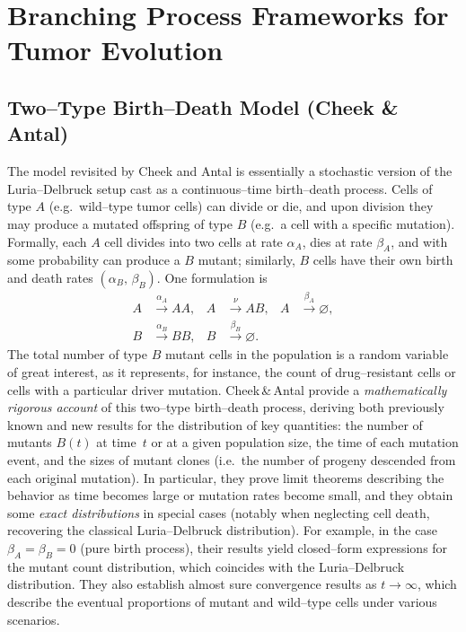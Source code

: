 \documentclass[11pt]{article}
\begin{document}
\section{Branching Process Frameworks for Tumor Evolution}
\subsection{Two--Type Birth--Death Model (Cheek \& Antal)}
The model revisited by Cheek and Antal is essentially a stochastic version of the Luria--Delbruck setup cast as a continuous--time birth--death process. Cells of type $A$ (e.g.~wild--type tumor cells) can divide or die, and upon division they may produce a mutated offspring of type $B$ (e.g.~a cell with a specific mutation). Formally, each $A$ cell divides into two cells at rate $\alpha_A$, dies at rate $\beta_A$, and with some probability can produce a $B$ mutant; similarly, $B$ cells have their own birth and death rates $(\alpha_B,\,\beta_B)$. One formulation is
\begin{align*}
A &\xrightarrow{\alpha_A} AA, & A &\xrightarrow{\nu} AB, & A &\xrightarrow{\beta_A} \varnothing,\\
B &\xrightarrow{\alpha_B} BB, & B &\xrightarrow{\beta_B} \varnothing. & &
\end{align*}
The total number of type $B$ mutant cells in the population is a random variable of great interest, as it represents, for instance, the count of drug--resistant cells or cells with a particular driver mutation. Cheek\,\&\,Antal provide a \emph{mathematically rigorous account} of this two--type birth--death process, deriving both previously known and new results for the distribution of key quantities: the number of mutants $B(t)$ at time~$t$ or at a given population size, the time of each mutation event, and the sizes of mutant clones (i.e.~the number of progeny descended from each original mutation). In particular, they prove limit theorems describing the behavior as time becomes large or mutation rates become small, and they obtain some \emph{exact distributions} in special cases (notably when neglecting cell death, recovering the classical Luria--Delbruck distribution). For example, in the case $\beta_A=\beta_B=0$ (pure birth process), their results yield closed--form expressions for the mutant count distribution, which coincides with the Luria--Delbruck distribution. They also establish almost sure convergence results as $t\to\infty$, which describe the eventual proportions of mutant and wild--type cells under various scenarios.
\end{document}
